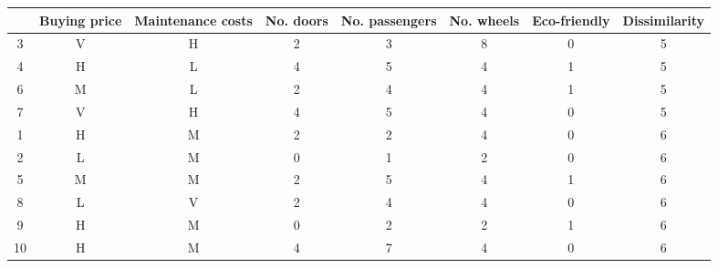 \begin{tabular}{cccccccc}
\toprule
{} & Buying price & Maintenance costs & No. doors & No. passengers & No. wheels & Eco-friendly &  Dissimilarity \\
\midrule
3  &            V &                 H &         2 &              3 &          8 &            0 &              5 \\
4  &            H &                 L &         4 &              5 &          4 &            1 &              5 \\
6  &            M &                 L &         2 &              4 &          4 &            1 &              5 \\
7  &            V &                 H &         4 &              5 &          4 &            0 &              5 \\
1  &            H &                 M &         2 &              2 &          4 &            0 &              6 \\
2  &            L &                 M &         0 &              1 &          2 &            0 &              6 \\
5  &            M &                 M &         2 &              5 &          4 &            1 &              6 \\
8  &            L &                 V &         2 &              4 &          4 &            0 &              6 \\
9  &            H &                 M &         0 &              2 &          2 &            1 &              6 \\
10 &            H &                 M &         4 &              7 &          4 &            0 &              6 \\
\bottomrule
\end{tabular}
